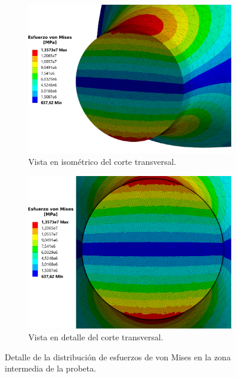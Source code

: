 \begin{figure}[]
	\ContinuedFloat
	\centering
	\begin{subfigure}{0.9\linewidth}
		\centering
		\includegraphics[width=\linewidth]{Imagenes/esfvm_corte_iso201}
		\caption{Vista en isométrico del corte transversal.}
		\label{fig:corte_iso201}
	\end{subfigure}		
	\begin{subfigure}{0.9\linewidth}
		\centering
		\includegraphics[width=\linewidth]{Imagenes/esfvm_corte201}
		\caption{Vista en detalle del corte transversal.}
		\label{fig:corte201}
	\end{subfigure}
\caption{Detalle de la distribución de esfuerzos de von Mises en la zona intermedia de la probeta.}
\label{fig:resultados_vm}
\end{figure}

